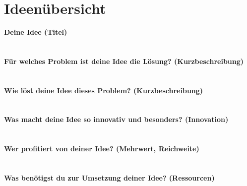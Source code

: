 \thispagestyle{empty}
\section*{Ideenübersicht}

\begin{Form}
   	
  	\textbf{Deine Idee (Titel)} \\ 
  	\TextField[multiline, name=ideeTitel, height = 1cm, width=0.9\textwidth]{}
  	\\ \\ 
  	\textbf{Für welches Problem ist deine Idee die Lösung? (Kurzbeschreibung)} 
  	\\ 
  	\TextField[multiline, name=background,width=0.9\textwidth,  height=2cm, value={} ]{}
  	\\ \\ 
  	 \textbf{Wie löst deine Idee dieses Problem? (Kurzbeschreibung)} 
  	 \\ 
  	\TextField[multiline, name=goal,width=0.9\textwidth,  height=2cm, value={}]{}
  	\\ \\ 
  	 \textbf{Was macht deine Idee so innovativ und besonders? (Innovation)}
  	 \\ 
  	\TextField[multiline, name=value,width=0.9\textwidth,  height=2cm, value={} ]{}
  	\\ \\ 
  	 \textbf{Wer profitiert von deiner Idee? (Mehrwert, Reichweite)} 
  	 \\ 
  	\TextField[multiline, name=must,width=0.9\textwidth,  height=2cm, value={}]{}
     \\ \\ 
  	 \textbf{Was benötigst du zur Umsetzung deiner Idee? (Ressourcen)} 
  	 \\ 
  	\TextField[multiline, name=priority,width=0.9\textwidth,  height=2cm, value={} ]{}
\end{Form}